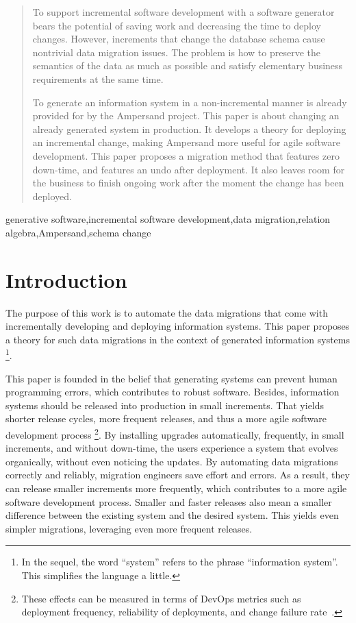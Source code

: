 \documentclass{elsarticle}
\begin{document}
\begin{abstract}
   To support incremental software development with a software generator bears the potential of saving work and decreasing the time to deploy changes.
   However, increments that change the database schema cause nontrivial data migration issues.
   The problem is how to preserve the semantics of the data as much as possible and satisfy elementary business requirements at the same time.

   To generate an information system in a non-incremental manner is already
   provided for by the Ampersand project.
   This paper is about changing an already generated system in production.
   It develops a theory for deploying an incremental change,
   making Ampersand more useful for agile software development.
   This paper proposes a migration method that features zero down-time,
   and features an undo after deployment.
   It also leaves room for the business to finish ongoing work
   after the moment the change has been deployed.
\end{abstract}

\begin{keyword}
generative software\sep incremental software development\sep data migration\sep relation algebra\sep Ampersand\sep schema change
\end{keyword}
\maketitle

\section{Introduction}
\label{sct:Introduction}
   The purpose of this work is to automate the data migrations that come with incrementally developing and deploying information systems.
   This paper proposes a theory for such data migrations in the context of generated information systems%
\footnote{In the sequel, the word ``system'' refers to the phrase ``information system''. This simplifies the language a little. }.

   This paper is founded in the belief that generating systems can prevent human programming errors, which contributes to robust software.
   Besides, information systems should be released into production in small increments.
   That yields shorter release cycles, more frequent releases, and thus a more agile software development process%
   \footnote{These effects can be measured in terms of DevOps metrics such as
   deployment frequency,
   reliability of deployments, and
   change failure rate~\cite{DevOps2021}.}.
   By installing upgrades automatically, frequently, in small increments, and without down-time,
   the users experience a system that evolves organically, without even noticing the updates.
   By automating data migrations correctly and reliably, migration engineers save effort and errors.
   As a result, they can release smaller increments more frequently, which contributes to a more agile software development process.
   Smaller and faster releases also mean a smaller difference between the existing system and the desired system.
   This yields even simpler migrations, leveraging even more frequent releases.
   
\end{document}

